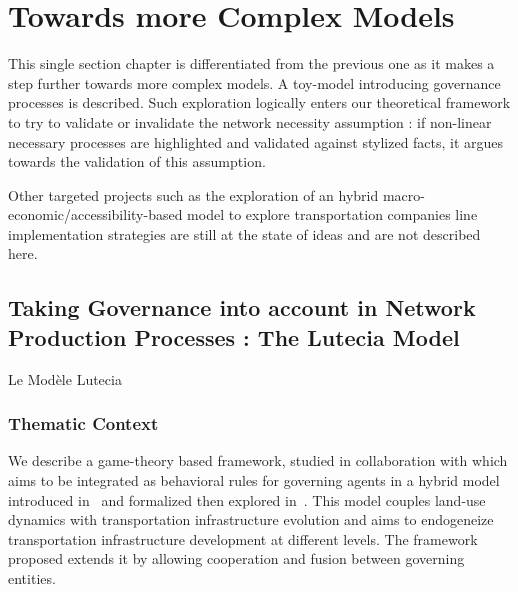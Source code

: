 




\chapter{Towards more Complex Models} %

\label{ch:complexmodels} %



This single section chapter is differentiated from the previous one as it makes a step further towards more complex models. A toy-model introducing governance processes is described. Such exploration logically enters our theoretical framework to try to validate or invalidate the network necessity assumption : if non-linear necessary processes are highlighted and validated against stylized facts, it argues towards the validation of this assumption. 

Other targeted projects such as the exploration of an hybrid macro-economic/accessibility-based model to explore transportation companies line implementation strategies are still at the state of ideas and are not described here.





\section[The Lutecia Model]{Taking Governance into account in Network Production Processes : The Lutecia Model}{Le Modèle Lutecia}


\subsection{Thematic Context}


We describe a game-theory based framework, studied in collaboration with  which aims to be integrated as behavioral rules for governing agents in a hybrid model introduced in~\cite{le2010approche} and formalized then explored in~\cite{lenechet2012}. This model couples land-use dynamics with transportation infrastructure evolution and aims to endogeneize transportation infrastructure development at different levels. The framework proposed extends it by allowing cooperation and fusion between governing entities.



